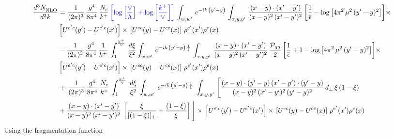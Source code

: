 \documentclass[9pt]{article}
\numberwithin{equation}{section}
\begin{document}
\begingroup\color{red}\begin{align}
     \frac{d^{3}N_{\rm NLO}^{\rm}}{d^{3}k}  & = \frac{1}{(2\pi)^{3}}\,\frac{g^{4}}{8\pi^{4}}\,\frac{N_{c}}{k^{+}}\,{\color{blue}\left[\log{\left[\frac{\vee}{\Lambda}\right]}+\log{\left[\frac{k^{+}}{\vee}\right]}\right]}\,\int_{w,w^{\prime}}\,e^{-ik\,\left(y'-y\right)}\,\int_{x,y,y^{\prime}}\,\frac{(x-y)\cdot(x'-y')}{(x-y)^{2}\,(x'-y')^{2}}\, \bigg[\frac{1}{\overline{\epsilon}} -\log{\left[4\pi^{2}\,\mu^{2}\,(y'-y)^{2}\right]}\bigg]\times\notag \\ &  \left[U^{e'c}(y') - U^{e'c}(x')\right] \times\, \left[U^{ec}(y) - U^{ce}(x)\right]\, \rho^{e'}(x') \rho^{e}(x) \notag \\ & - \frac{1}{(2\pi)^{3}}\,\frac{g^{4}}{8\pi^{4}}\,\frac{1}{k^{+}}\,\int_{1}^{\frac{k^{+}}{\vee}}\, \frac{d\xi}{\xi^{2}}\int_{w,w^{\prime}}\,e^{-ik\,\left(y'-y\right)\,\frac{1}{\xi}}\,\int_{x,y,y^{\prime}}\,\frac{(x-y)\cdot(x'-y')}{(x-y)^{2}\,(x'-y')^{2}}\,\frac{\mathcal{P}_{gg}}{2}\, \bigg[\frac{1}{\overline{\epsilon}}  +1 -\log{\left[4\pi^{2}\,\mu^{2}\,(y'-y)^{2}\right]}\bigg]\times\notag \\ &  \left[U^{e'c}(y') - U^{e'c}(x')\right] \times\, \left[U^{ec}(y) - U^{ce}(x)\right]\, \rho^{e'}(x') \rho^{e}(x) \notag \\ &
     +\, \frac{1}{(2\pi)^{3}}\,\frac{g^{4}}{8\pi^{4}}\,\frac{N_{c}}{k^{+}}\,\int_{1}^{\frac{k^{+}}{\vee}}\, \frac{d\xi}{\xi^{2}}\,\int_{w,w^{\prime}}\,e^{-ik\,\left(y'-y\right)\,\frac{1}{\xi}}\,\,\int_{x,y,y^{\prime}}\,\Bigg[\frac{(x-y)\cdot (y'-y)\, (x'-y')\cdot (y'-y)}{(x-y)^{2}\,(x'-y')^{2}\,(y'-y)^{2}}\,d_{\perp}\, \xi\,(1-\xi)  \notag \\ & +\frac{(x-y)\cdot(x'-y')}{(x-y)^{2}\,(x'-y')^{2}}\,\left[\frac{\xi}{[(1-\xi)]_{+}}+\frac{(1-\xi)}{\xi}\right] \Bigg]\times\,\left[U^{e'c}(y') - U^{e'c}(x')\right] \times\, \left[U^{ec}(y) - U^{ce}(x)\right]\, \rho^{e'}(x') \rho^{e}(x)
\end{align}\endgroup
Using the fragmentation function
\end{document}
